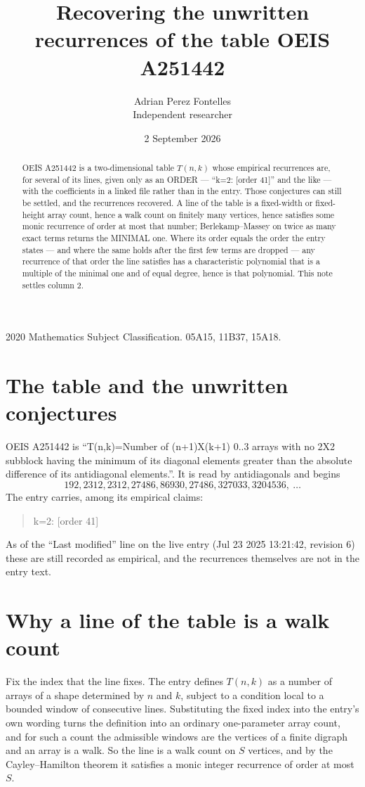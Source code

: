 \documentclass[11pt,a4paper]{article}
\title{Recovering the unwritten recurrences of the table OEIS A251442}
\author{Adrian Perez Fontelles\\ \small Independent researcher}
\date{2 September 2026}
\theoremstyle{plain}
\theoremstyle{definition}
\begin{document}
\maketitle

\begin{abstract}
OEIS A251442 is a two-dimensional table $T(n,k)$ whose empirical recurrences are, for several of
its lines, given only as an ORDER --- ``k=2: [order 41]'' and the like --- with the
coefficients in a linked file rather than in the entry. Those conjectures can still be settled,
and the recurrences recovered. A line of the table is a fixed-width or fixed-height array
count, hence a walk count on finitely many vertices, hence satisfies some monic recurrence of
order at most that number; Berlekamp--Massey on twice as many exact terms returns the MINIMAL
one. Where its order equals the order the entry states --- and where the same holds after the
first few terms are dropped --- any recurrence of that order the line satisfies has a
characteristic polynomial that is a multiple of the minimal one and of equal degree, hence is
that polynomial. This note settles column 2.
\end{abstract}

\noindent\small 2020 Mathematics Subject Classification. 05A15, 11B37, 15A18.\normalsize

\section{The table and the unwritten conjectures}

OEIS A251442 is ``T(n,k)=Number of (n+1)X(k+1) 0..3 arrays with no 2X2 subblock having the minimum of its diagonal elements greater than the absolute difference of its antidiagonal elements.''. It is read by antidiagonals and begins
\[
192, 2312, 2312, 27486, 86930, 27486, 327033, 3204536,\ \dots
\]
The entry carries, among its empirical claims:
\begin{quote}\small
k=2: [order 41]
\end{quote}
As of the ``Last modified'' line on the live entry (Jul 23 2025 13:21:42, revision 6) these are still
recorded as empirical, and the recurrences themselves are not in the entry text.

\section{Why a line of the table is a walk count}

Fix the index that the line fixes. The entry defines $T(n,k)$ as a number of arrays of a shape
determined by $n$ and $k$, subject to a condition local to a bounded window of consecutive
lines. Substituting the fixed index into the entry's own wording turns the definition into an
ordinary one-parameter array count, and for such a count the admissible windows are the
vertices of a finite digraph and an array is a walk. So the line is a walk count on $S$
vertices, and by the Cayley--Hamilton theorem it satisfies a monic integer recurrence of order
at most $S$.
\end{document}
